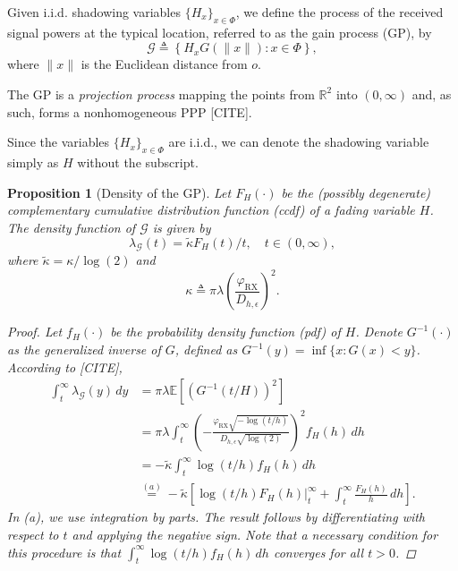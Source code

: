 \documentclass[lettersize,journal]{IEEEtran}
\newtheorem{prop}[theorem]{Proposition}
\begin{document}
Given i.i.d. shadowing variables $\{H_x\}_{x \in \Phi}$, we define the process of the received signal powers at the typical location, referred to as the gain process (GP), by
\begin{equation}
  \label{eq:gainprocess}
  \mathcal{G} \triangleq \left\{ H_x G(\|x\|) : x \in \Phi \right\},
\end{equation}
where $\|x\|$ is the Euclidean distance from $\textit{o}$. 

The GP is a \textit{projection process} mapping the points from $\mathbb{R}^2$ into $(0,\infty)$ and, as such, forms a nonhomogeneous PPP [CITE].



Since the variables $\{H_x\}_{x \in \Phi}$ are i.i.d., we can denote the shadowing variable simply as $H$ without the subscript.
\begin{prop}[Density of the GP]
  Let $F_H(\cdot)$ be the (possibly degenerate) complementary cumulative distribution function (ccdf) of a fading variable $H$. The density function of $\mathcal{G}$ is given by
  \begin{equation}
    \label{eq:GPdensity}
    \lambda_{\mathcal{G}}(t) = \tilde{\kappa} {F_H(t)}/{t}, \quad t \in (0, \infty),
  \end{equation}
  where $\tilde{\kappa} = {\kappa}/{\log(2)}$ and
  \begin{equation}
    \label{eq:kappa}
    \kappa \triangleq \pi \lambda \left(\frac{\varphi_{\text{RX}}}{D_{h,\epsilon}}\right)^2.
  \end{equation}
  
  \begin{proof}
    Let $f_H(\cdot)$ be the probability density function (pdf) of $H$. Denote $G^{-1}(\cdot)$ as the generalized inverse of $G$, defined as $G^{-1}(y) = \inf \{x : G(x) < y\}$. According to [CITE],
    \begin{align*}
      \int_t^{\infty} \lambda_{\mathcal{G}}(y) \, dy &= \pi \lambda \mathbb{E}\left[ \left({G^{-1}(t/H)}{}\right)^2 \right] \\
      &= \pi \lambda \int_t^{\infty} \left(-\frac{\varphi_{\text{RX}} \sqrt{-\log(t/h)}}{D_{h,\epsilon} \sqrt{\log(2)}}\right)^2 f_H(h) \, dh \\
      &= -\tilde{\kappa} \int_t^{\infty} \log(t/h) f_H(h) \, dh \\
      &\overset{(a)}{=} -\tilde{\kappa} \left[ \left. \log(t/h) F_H(h) \right|_t^{\infty} + \int_t^{\infty} \frac{F_H(h)}{h} \, dh \right].
    \end{align*}
    In (a), we use integration by parts. The result follows by differentiating with respect to $t$ and applying the negative sign. Note that a necessary condition for this procedure is that $\int_t^{\infty} \log(t/h) f_H(h) \, dh$ converges for all $t > 0$.
  \end{proof}
\end{prop}
\end{document}
